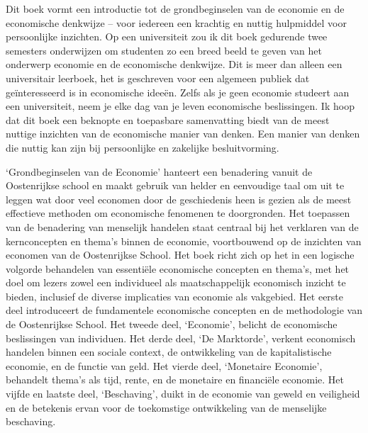 Dit boek vormt een introductie tot de grondbeginselen van de economie en de economische denkwijze – voor iedereen een krachtig en nuttig hulpmiddel voor persoonlijke inzichten. Op een universiteit zou ik dit boek gedurende twee semesters onderwijzen om studenten zo een breed beeld te geven van het onderwerp economie en de economische denkwijze. Dit is meer dan alleen een universitair leerboek, het is geschreven voor een algemeen publiek dat geïnteresseerd is in economische ideeën. Zelfs als je geen economie studeert aan een universiteit, neem je elke dag van je leven economische beslissingen. Ik hoop dat dit boek een beknopte en toepasbare samenvatting biedt van de meest nuttige inzichten van de economische manier van denken. Een manier van denken die nuttig kan zijn bij persoonlijke en zakelijke besluitvorming.

`Grondbeginselen van de Economie' hanteert een benadering vanuit de Oostenrijkse school en maakt gebruik van helder en eenvoudige taal om uit te leggen wat door veel economen door de geschiedenis heen is gezien als de meest effectieve methoden om economische fenomenen te doorgronden. Het toepassen van de benadering van menselijk handelen staat centraal bij het verklaren van de kernconcepten en thema's binnen de economie, voortbouwend op de inzichten van economen van de Oostenrijkse School. Het boek richt zich op het in een logische volgorde behandelen van essentiële economische concepten en thema's, met het doel om lezers zowel een individueel als maatschappelijk economisch inzicht te bieden, inclusief de diverse implicaties van economie als vakgebied. Het eerste deel introduceert de fundamentele economische concepten en de methodologie van de Oostenrijkse School. Het tweede deel, `Economie', belicht de economische beslissingen van individuen. Het derde deel, `De Marktorde', verkent economisch handelen binnen een sociale context, de ontwikkeling van de kapitalistische economie, en de functie van geld. Het vierde deel, `Monetaire Economie', behandelt thema's als tijd, rente, en de monetaire en financiële economie. Het vijfde en laatste deel, `Beschaving', duikt in de economie van geweld en veiligheid en de betekenis ervan voor de toekomstige ontwikkeling van de menselijke beschaving.

